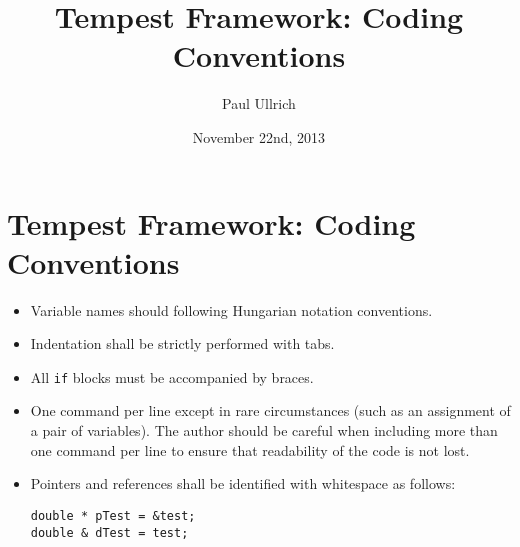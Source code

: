 \documentclass{article}
\title{\Huge \textbf{Tempest Framework: Coding Conventions}}
\author{\Large Paul Ullrich}
\date{November 22nd, 2013}
\begin{document}
\section{Tempest Framework: Coding Conventions}

\begin{itemize}
\item Variable names should following Hungarian notation conventions.

\item Indentation shall be strictly performed with tabs.

\item All \texttt{if} blocks must be accompanied by braces.

\item One command per line except in rare circumstances (such as an assignment of a pair of variables).  The author should be careful when including more than one command per line to ensure that readability of the code is not lost.

\item Pointers and references shall be identified with whitespace as follows:
\begin{verbatim}
double * pTest = &test;
double & dTest = test;
\end{verbatim}
\end{itemize}
\end{document}
